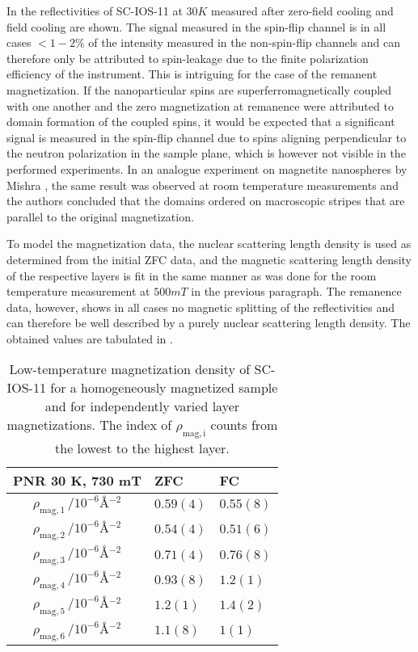 \documentclass[\main/dresen_thesis.tex]{subfiles}
\begin{document}
  In  the reflectivities of SC-IOS-11 at $30 \unit{K}$ measured after zero-field cooling and field cooling are shown.
  The signal measured in the spin-flip channel is in all cases $<1-2 \%$ of the intensity measured in the non-spin-flip channels and can therefore only be attributed to spin-leakage due to the finite polarization efficiency of the instrument.
  This is intriguing for the case of the remanent magnetization.
  If the nanoparticular spins are superferromagnetically coupled with one another and the zero magnetization at remanence were attributed to domain formation of the coupled spins, it would be expected that a significant signal is measured in the spin-flip channel due to spins aligning perpendicular to the neutron polarization in the sample plane, which is however not visible in the performed experiments.
  In an analogue experiment on magnetite nanospheres by Mishra \etal \cite{Mishra_2015_Polar}, the same result was observed at room temperature measurements and the authors concluded that the domains ordered on macroscopic stripes that are parallel to the original magnetization.

  To model the magnetization data, the nuclear scattering length density is used as determined from the initial ZFC data, and the magnetic scattering length density of the respective layers is fit in the same manner as was done for the room temperature measurement at $500 \unit{mT}$ in the previous paragraph.
  The remanence data, however, shows in all cases no magnetic splitting of the reflectivities and can therefore be well described by a purely nuclear scattering length density.
  The obtained values are tabulated in .

  \begin{table}[!htbp]
    \centering
    \caption{\label{tab:looselyPackedNP:layers:pnrSCIOS30K730mT}Low-temperature magnetization density of SC-IOS-11 for a homogeneously magnetized sample and for independently varied layer magnetizations. The index of $\rho_\mathrm{mag, i}$ counts from the lowest to the highest layer.}
    \begin{tabular}{ c | l | l}
      \rule{0pt}{2ex} \textbf{PNR \@ 30 K, 730 mT}  & ZFC & FC \\
      \hline
      $\rho_\mathrm{mag, 1} \, / \unit{10^{-6} \angstrom^{-2}} $ & $0.59(4)$ & $0.55(8)$\\
      $\rho_\mathrm{mag, 2} \, / \unit{10^{-6} \angstrom^{-2}} $ & $0.54(4)$ & $0.51(6)$\\
      $\rho_\mathrm{mag, 3} \, / \unit{10^{-6} \angstrom^{-2}} $ & $0.71(4)$ & $0.76(8)$\\
      $\rho_\mathrm{mag, 4} \, / \unit{10^{-6} \angstrom^{-2}} $ & $0.93(8)$ & $1.2(1)$\\
      $\rho_\mathrm{mag, 5} \, / \unit{10^{-6} \angstrom^{-2}} $ & $1.2(1)$  & $1.4(2)$\\
      $\rho_\mathrm{mag, 6} \, / \unit{10^{-6} \angstrom^{-2}} $ & $1.1(8)$  & $1(1)$\\
      \hline
    \end{tabular}
  \end{table}
\end{document}
